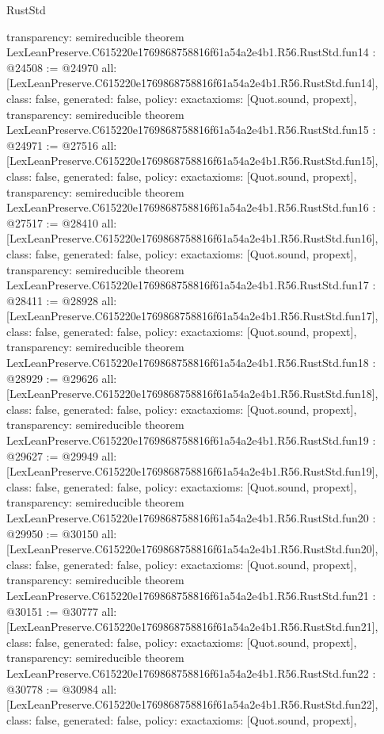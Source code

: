 \begin{lexlean}{RustStd}
\begin{coremodule}
{  transparency: semireducible
}
theorem LexLeanPreserve.C615220e1769868758816f61a54a2e4b1.R56.RustStd.fun14 : @24508 := @24970 {
  all: [LexLeanPreserve.C615220e1769868758816f61a54a2e4b1.R56.RustStd.fun14],
  class: false,
  generated: false,
  policy: exact{axioms: [Quot.sound, propext]},
  transparency: semireducible
}
theorem LexLeanPreserve.C615220e1769868758816f61a54a2e4b1.R56.RustStd.fun15 : @24971 := @27516 {
  all: [LexLeanPreserve.C615220e1769868758816f61a54a2e4b1.R56.RustStd.fun15],
  class: false,
  generated: false,
  policy: exact{axioms: [Quot.sound, propext]},
  transparency: semireducible
}
theorem LexLeanPreserve.C615220e1769868758816f61a54a2e4b1.R56.RustStd.fun16 : @27517 := @28410 {
  all: [LexLeanPreserve.C615220e1769868758816f61a54a2e4b1.R56.RustStd.fun16],
  class: false,
  generated: false,
  policy: exact{axioms: [Quot.sound, propext]},
  transparency: semireducible
}
theorem LexLeanPreserve.C615220e1769868758816f61a54a2e4b1.R56.RustStd.fun17 : @28411 := @28928 {
  all: [LexLeanPreserve.C615220e1769868758816f61a54a2e4b1.R56.RustStd.fun17],
  class: false,
  generated: false,
  policy: exact{axioms: [Quot.sound, propext]},
  transparency: semireducible
}
theorem LexLeanPreserve.C615220e1769868758816f61a54a2e4b1.R56.RustStd.fun18 : @28929 := @29626 {
  all: [LexLeanPreserve.C615220e1769868758816f61a54a2e4b1.R56.RustStd.fun18],
  class: false,
  generated: false,
  policy: exact{axioms: [Quot.sound, propext]},
  transparency: semireducible
}
theorem LexLeanPreserve.C615220e1769868758816f61a54a2e4b1.R56.RustStd.fun19 : @29627 := @29949 {
  all: [LexLeanPreserve.C615220e1769868758816f61a54a2e4b1.R56.RustStd.fun19],
  class: false,
  generated: false,
  policy: exact{axioms: [Quot.sound, propext]},
  transparency: semireducible
}
theorem LexLeanPreserve.C615220e1769868758816f61a54a2e4b1.R56.RustStd.fun20 : @29950 := @30150 {
  all: [LexLeanPreserve.C615220e1769868758816f61a54a2e4b1.R56.RustStd.fun20],
  class: false,
  generated: false,
  policy: exact{axioms: [Quot.sound, propext]},
  transparency: semireducible
}
theorem LexLeanPreserve.C615220e1769868758816f61a54a2e4b1.R56.RustStd.fun21 : @30151 := @30777 {
  all: [LexLeanPreserve.C615220e1769868758816f61a54a2e4b1.R56.RustStd.fun21],
  class: false,
  generated: false,
  policy: exact{axioms: [Quot.sound, propext]},
  transparency: semireducible
}
theorem LexLeanPreserve.C615220e1769868758816f61a54a2e4b1.R56.RustStd.fun22 : @30778 := @30984 {
  all: [LexLeanPreserve.C615220e1769868758816f61a54a2e4b1.R56.RustStd.fun22],
  class: false,
  generated: false,
  policy: exact{axioms: [Quot.sound, propext]},
}
\end{coremodule}
\end{lexlean}
